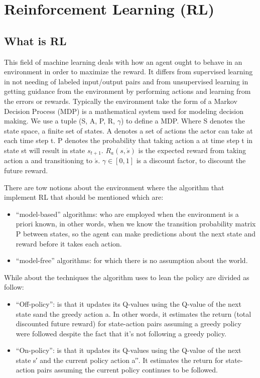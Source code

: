 \chapter{Reinforcement Learning (RL)}
\label{cha:3}
\vspace{1cm}

\section{What is RL}
This field of machine learning deals with how an agent ought to behave in an environment in order to maximize the reward. It differs from supervised learning in not needing of labeled input/output pairs and from unsupervised learning in getting guidance from the environment by performing actions and learning from the errors or rewards. Typically the environment take the form of a Markov Decision Process (MDP) is a mathematical system used for modeling decision making. We use a tuple (S, A, P, R, $\gamma$) to define a MDP. Where S denotes the state space, a finite set of states. A denotes a set of actions the actor can take at each time step t. P denotes the probability that taking action a at time step t in state st will result in state $s_{t+1}$. $R_a(s,\acute{s})$ is the expected reward from taking action a and transitioning to $\acute{s}$. $\gamma \in [0, 1]$ is a discount factor, to discount the future reward.

\vspace{0.3cm}
There are tow notions about the environment where the algorithm that implement RL that should be mentioned which are:
\begin{itemize}
	\item “model-based” algorithms: who are employed when the environment is a priori known, in other words, when we know the transition probability matrix P between states, so the agent can make predictions about the next state and reward before it takes each action.
\end{itemize}
\begin{itemize}
	\item “model-free” algorithms: for which there is no assumption about the world.
\end{itemize}
While about the techniques the algorithm uses to lean the policy are divided as follow:
\begin{itemize}
	\item \textquotedblleft Off-policy\textquotedblright: is that it updates its Q-values using the Q-value of the next state s\textasciigrave and the greedy action a\textasciigrave. In other words, it estimates the return (total discounted future reward) for state-action pairs assuming a greedy policy were followed despite the fact that it's not following a greedy policy.
\end{itemize}
\begin{itemize}
	\item \textquotedblleft On-policy\textquotedblright: is that it updates its Q-values using the Q-value of the next state s′ and the current policy action a′′. It estimates the return for state-action pairs assuming the current policy continues to be followed.
\end{itemize}


